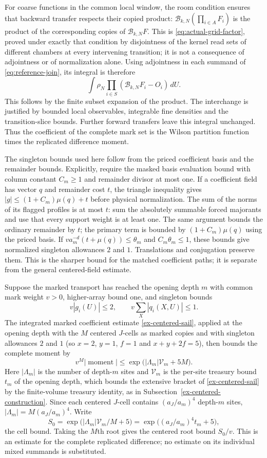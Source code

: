 For coarse functions in the common local window, the room
condition ensures that backward transfer respects their copied
product: $\mathcal B_{k,N}(\prod_{i\in A}F_i)$ is the product
of the corresponding copies of $\mathcal B_{k,N}F$. This is
\eqref{eq:actual-grid-factor}, proved under exactly that condition
by disjointness of the kernel read sets of different chambers at every
intervening transition; it is not a consequence of adjointness or of
normalization alone.
Using adjointness in each summand of
\eqref{eq:reference-join}, its integral is therefore
\[
       \int\rho_N\prod_{i\in S}
                     (\mathcal B_{k,N}F_i-O_i)\,dU.
\]
This follows by the finite subset expansion of the product.
The interchange is justified by bounded local observables,
integrable fine densities and the transition-slice bounds.
Further forward transfers leave this integral unchanged.
Thus the coefficient of the complete mark set is the Wilson
partition function times the replicated difference moment.

The singleton bounds used here follow from the priced coefficient
basis and the remainder bounds. Explicitly, require the masked
basis evaluation bound with column constant $C_m\ge1$ and
remainder divisor at most one. If a coefficient field has vector
$q$ and remainder cost $t$, the triangle inequality gives
$|g|\le(1+C_m)\mu(q)+t$ before physical normalization.
The sum of the norms of its flagged profiles is at most $t$: sum
the absolutely summable forced majorants and use that every support
weight is at least one. The same argument bounds the ordinary
remainder by $t$; the primary term is bounded by
$(1+C_m)\mu(q)$ using the priced basis. If
$v a_m^{-d}(t+\mu(q))\le\theta_m$ and
$C_m\theta_m\le1$, these bounds give normalized singleton
allowances $2$ and $1$. Translations and conjugation preserve
them. This is the sharper bound for the matched coefficient paths;
it is separate from the general centered-field estimate.

Suppose the marked transport has reached the opening depth $m$ with
common mark weight $v>0$, higher-array bound one, and singleton bounds
\[
      v|g_i(U)|\le2,\qquad
          v\sum_X|q_i(X,U)|\le1.
\]
The integrated marked coefficient estimate
\eqref{ex-centered-sail}, applied at the opening depth with the $M$
centered $J$-cells as marked copies and with singleton allowances
$2$ and $1$ (so $x=2$, $y=1$, $f=1$ and $x+y+2f=5$), then bounds the
complete moment by
\[
      v^M|\operatorname{moment}|\le
       \exp\bigl(|\Lambda_m|\mathcal V_m+5M\bigr).
\]
Here $|\Lambda_m|$ is the number of depth-$m$ sites and $\mathcal V_m$
is the per-site treasury bound $t_m$ of the opening depth, which bounds
the extensive bracket of \eqref{ex-centered-sail} by the finite-volume
treasury identity, as in Subsection~\ref{ex-centered-construction}. Since
each centered $J$-cell contains $(a_J/a_m)^4$ depth-$m$ sites,
$|\Lambda_m|=M(a_J/a_m)^4$. Write
\[
 S_0=\exp\bigl(|\Lambda_m|\mathcal V_m/M+5\bigr)
    =\exp\bigl((a_J/a_m)^4t_m+5\bigr),
\]
the cell bound.
Taking the $M$th root gives the centered root bound $S_0/v$.
This is an estimate for the complete replicated difference;
no estimate on its individual mixed summands is substituted.

